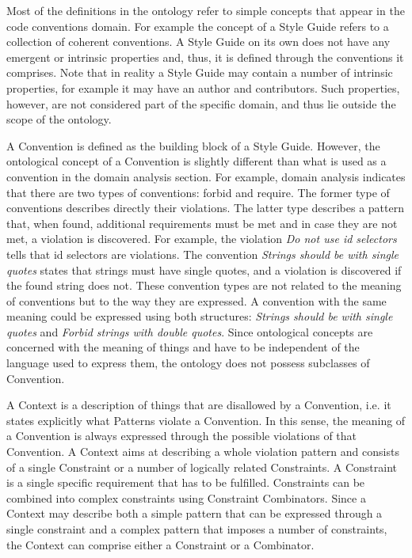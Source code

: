 Most of the definitions in the ontology refer to simple concepts that appear in the code conventions
domain. For example the concept of a Style Guide refers to a collection of coherent conventions. A
Style Guide on its own does not have any emergent or intrinsic properties and, thus, it is defined
through the conventions it comprises. Note that in reality a Style Guide may contain a number of
intrinsic properties, for example it may have an author and contributors. Such
properties, however, are not considered part of the specific domain, and thus lie outside the scope
of the ontology.

A Convention is defined as the building block of a Style Guide. However, the ontological concept of
a Convention is slightly different than what is used as a convention in the domain analysis section.
For example, domain analysis indicates that there are two types of conventions: forbid and require.
The former type of conventions describes directly their violations. The latter type describes a
pattern that, when found, additional requirements must be met and in case they are not met, a
violation is discovered. For example, the violation \textit{Do not use id selectors} tells that id
selectors are violations. The convention \textit{Strings should be with single quotes} states that
strings must have single quotes, and a violation is discovered if the found string does not. These
convention types are not related to the meaning of conventions but to the way they are expressed. A
convention with the same meaning could be expressed using both structures: \textit{Strings should be
with single quotes} and \textit{Forbid strings with double quotes}. Since ontological concepts are
concerned with the meaning of things and have to be independent of the language used to express
them, the ontology does not possess subclasses of Convention.

A Context is a description of things that are disallowed by a Convention, i.e. it states explicitly
what Patterns violate a Convention. In this sense, the meaning of a Convention is always expressed
through the possible violations of that Convention. A Context aims at describing a whole violation
pattern and consists of a single Constraint or a number of logically related Constraints. A
Constraint is a single specific requirement that has to be fulfilled. Constraints can be combined
into complex constraints using Constraint Combinators. Since a Context may describe both a simple
pattern that can be expressed through a single constraint and a complex pattern that imposes a
number of constraints, the Context can comprise either a Constraint or a Combinator. 

